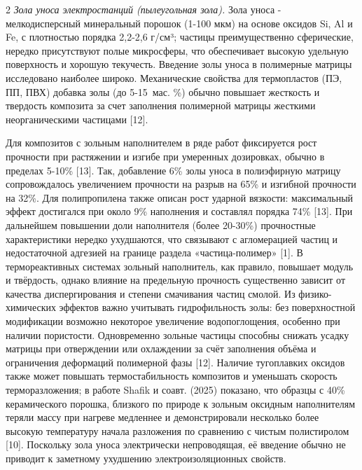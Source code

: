 \begin{multicols}{2}
\emph{Зола уноса электростанций (пылеугольная зола).} Зола уноса -
мелкодисперсный минеральный порошок (1-100 мкм) на основе оксидов Si, Al
и Fe, с плотностью порядка 2,2-2,6 г/см³; частицы преимущественно
сферические, нередко присутствуют полые микросферы, что обеспечивает
высокую удельную поверхность и хорошую текучесть. Введение золы уноса в
полимерные матрицы исследовано наиболее широко. Механические свойства
для термопластов (ПЭ, ПП, ПВХ) добавка золы (до 5-15~мас. \%) обычно
повышает жесткость и твердость композита за счет заполнения полимерной
матрицы жесткими неорганическими частицами {[}12{]}.

Для композитов с зольным наполнителем в ряде работ фиксируется рост
прочности при растяжении и изгибе при умеренных дозировках, обычно в
пределах 5-10\% {[}13{]}. Так, добавление 6\% золы уноса в полиэфирную
матрицу сопровождалось увеличением прочности на разрыв на 65\% и
изгибной прочности на 32\%. Для полипропилена также описан рост ударной
вязкости: максимальный эффект достигался при около 9\% наполнения и
составлял порядка 74\% {[}13{]}. При дальнейшем повышении доли
наполнителя (более 20-30\%) прочностные характеристики нередко
ухудшаются, что связывают с агломерацией частиц и недостаточной адгезией
на границе раздела «частица-полимер» {[}1{]}. В термореактивных системах
зольный наполнитель, как правило, повышает модуль и твёрдость, однако
влияние на предельную прочность существенно зависит от качества
диспергирования и степени смачивания частиц смолой. Из физико-химических
эффектов важно учитывать гидрофильность золы: без поверхностной
модификации возможно некоторое увеличение водопоглощения, особенно при
наличии пористости. Одновременно зольные частицы способны снижать усадку
матрицы при отверждении или охлаждении за счёт заполнения объёма и
ограничения деформаций полимерной фазы {[}12{]}. Наличие тугоплавких
оксидов также может повышать термостабильность композитов и уменьшать
скорость терморазложения; в работе Shafik и соавт. (2025) показано, что
образцы с 40\% керамического порошка, близкого по природе к зольным
оксидным наполнителям теряли массу при нагреве медленнее и
демонстрировали несколько более высокую температуру начала разложения по
сравнению с чистым полистиролом {[}10{]}. Поскольку зола уноса
электрически непроводящая, её введение обычно не приводит к заметному
ухудшению электроизоляционных свойств.


\end{multicols}
